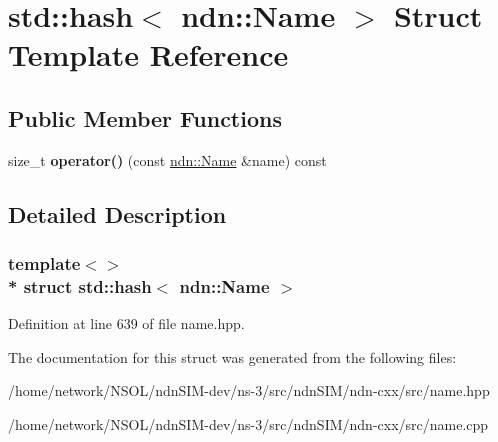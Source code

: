 \hypertarget{structstd_1_1hash_3_01ndn_1_1Name_01_4}{}\section{std\+:\+:hash$<$ ndn\+:\+:Name $>$ Struct Template Reference}
\label{structstd_1_1hash_3_01ndn_1_1Name_01_4}
\subsection*{Public Member Functions}
\begin{DoxyCompactItemize}
\item 
size\+\_\+t {\bfseries operator()} (const \hyperlink{classndn_1_1Name}{ndn\+::\+Name} \&name) const\hypertarget{structstd_1_1hash_3_01ndn_1_1Name_01_4_a95c2659a146f7a8e94d9f253cd382fff}{}\label{structstd_1_1hash_3_01ndn_1_1Name_01_4_a95c2659a146f7a8e94d9f253cd382fff}

\end{DoxyCompactItemize}


\subsection{Detailed Description}
\subsubsection*{template$<$$>$\\*
struct std\+::hash$<$ ndn\+::\+Name $>$}



Definition at line 639 of file name.\+hpp.



The documentation for this struct was generated from the following files\+:\begin{DoxyCompactItemize}
\item 
/home/network/\+N\+S\+O\+L/ndn\+S\+I\+M-\/dev/ns-\/3/src/ndn\+S\+I\+M/ndn-\/cxx/src/name.\+hpp\item 
/home/network/\+N\+S\+O\+L/ndn\+S\+I\+M-\/dev/ns-\/3/src/ndn\+S\+I\+M/ndn-\/cxx/src/name.\+cpp\end{DoxyCompactItemize}
